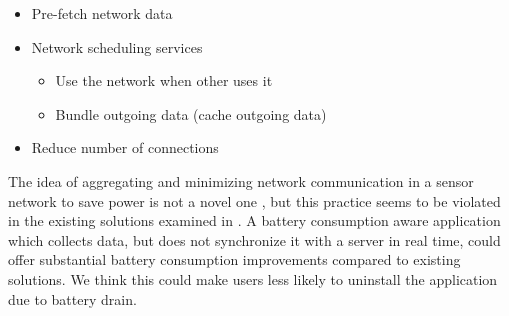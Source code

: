 \begin{itemize}
	\setlength\itemsep{-0.3em}
    \item Pre-fetch network data
    \item Network scheduling services
    \vspace{-0.8em}
    \begin{itemize}
    	\setlength\itemsep{-0.3em}
    	\item Use the network when other uses it
        \item Bundle outgoing data (cache outgoing data)
    \end{itemize}
    \vspace{-0.6em}
    \item Reduce number of connections
\end{itemize}

The idea of aggregating and minimizing network communication in a sensor network to save power is not a novel one \parencite{korteweg2007data} \parencite{mhatre2004design}, but this practice seems to be violated in the existing solutions examined in . A battery consumption aware application which collects data, but does not synchronize it with a server in real time, could offer substantial battery consumption improvements compared to existing solutions. We think this could make users less likely to uninstall the application due to battery drain.